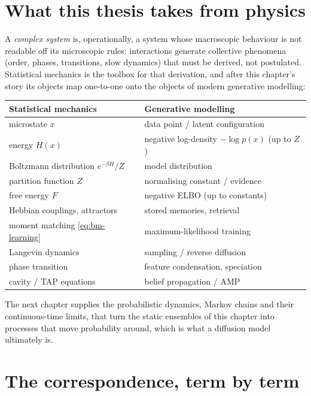 \section{What this thesis takes from physics}

A \emph{complex system} is, operationally, a system whose macroscopic
behaviour is not readable off its microscopic rules: interactions
generate collective phenomena (order, phases, transitions, slow dynamics)
that must be derived, not postulated. Statistical mechanics is the
toolbox for that derivation, and after this chapter's story its objects
map one-to-one onto the objects of modern generative modelling:
\begin{center}
\begin{tabular}{ll}
\toprule
\textbf{Statistical mechanics} & \textbf{Generative modelling} \\
\midrule
microstate $x$ & data point / latent configuration \\
energy $H(x)$ & negative log-density $-\log p(x)$ (up to $Z$) \\
Boltzmann distribution $e^{-\beta H}/Z$ & model distribution \\
partition function $Z$ & normalising constant / evidence \\
free energy $F$ & negative ELBO (up to constants) \\
Hebbian couplings, attractors & stored memories, retrieval \\
moment matching \eqref{eq:bm-learning} & maximum-likelihood training \\
Langevin dynamics & sampling / reverse diffusion \\
phase transition & feature condensation, speciation \\
cavity / TAP equations & belief propagation / AMP \\
\bottomrule
\end{tabular}
\end{center}
The next chapter supplies the probabilistic dynamics, Markov chains and
their continuous-time limits, that turn the static ensembles of this
chapter into processes that move probability around, which is what a
diffusion model ultimately is.

\section{The correspondence, term by term}\label{sec:statmech-dictionary}

